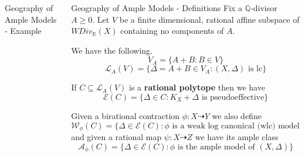 \documentclass[final]{beamer}
\begin{document}
\begin{frame}[t, fragile]
\begin{columns}[t]
\begin{column}{0.36\paperwidth}
\begin{block}{Geography of Ample Models - Example}
\begin{figure}
				\end{figure}
				
				
				
			\end{block}
			
			
			
			
			
		\end{column}
		
		
		\begin{column}{0.44\paperwidth}
			
			\begin{block}{Geography of Ample Models - Definitions}
				Fix a $\mathbb{Q}$-divisor $A\geq 0$. Let $V$ be a finite dimensional, rational affine subspace of $WDiv_{\mathbb{R}}(X)$ containing no components of $A$.
				
				We have the following.
				\[V_{A}= \{A+B: B \in V\}\]
				\[\mathcal{L}_{A}(V)=\{\Delta=A+B \in V_{A}: (X,\Delta) \text{ is lc}\}\]
				
				If $C \subseteq \mathcal{L}_{A}(V)$ is a \textbf{rational polytope} then we have
				\[\mathcal{E}(C)=\{\Delta \in C: K_{X}+\Delta \text{ is pseudoeffective}\}\]
				
				Given a birational contraction $\phi:X \dashrightarrow Y$ we also define
				\[\mathcal{W}_{\phi}(C)=\{\Delta \in \mathcal{E}(C): \phi \text{ is a weak log canonical (wlc) model of } (X,\Delta)\}\]
				and given a rational map $\psi:X \dashrightarrow Z$ we have its ample class
				\[\mathcal{A}_{\phi}(C)=\{\Delta \in \mathcal{E}(C): \phi \text{ is the ample model of } (X,\Delta)\}\]
				

\end{block}
\end{column}
\end{columns}
\end{frame}
\end{document}
